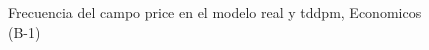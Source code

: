 \begin{figure}[H]
    \centering
    
    \caption{Frecuencia del campo  price en el modelo real y tddpm, Economicos (B-1)}
    \label{frecuency- Price-tddpm_mlp}
\end{figure}
